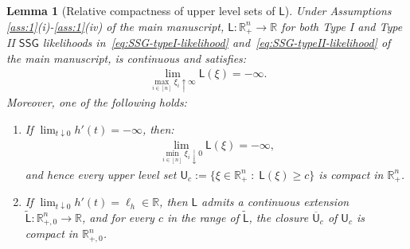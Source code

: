\documentclass[12pt]{article}
\newtheorem{lemma}{Lemma}[section]
\numberwithin{equation}{section}
\begin{document}
\begin{lemma}[Relative compactness of upper level sets of $\mathsf{L}$]
\label{lemma-conv:1}  
Under Assumptions \ref{ass:1}(i)-\ref{ass:1}(iv) of the main manuscript, $\mathsf{L}:\mathbb{R}_{+}^{n}\to \mathbb{R}$ for both Type I and Type II $\mathsf{SSG}$ likelihoods in~\eqref{eq:SSG-typeI-likelihood} and~\eqref{eq:SSG-typeII-likelihood} of the main manuscript, is continuous and satisfies:
\begin{gather}
    \label{eq:L1.1}
        \lim_{\max_{i\in [n]} \xi_i \uparrow \infty}\mathsf{L}(\xi) = -\infty.
\end{gather}
Moreover, one of the following holds:
\begin{enumerate}
    \item If $\lim_{t\downarrow 0}h'(t) = -\infty$, then:
    \begin{align}
    \label{eq:L1.2}
    \lim_{\min_{i\in [n]} \xi_i \downarrow 0} \mathsf{L}(\xi) = -\infty,
    \end{align}
    and hence every upper level set $\mathsf{U}_c := \{\xi\in \mathbb{R}^{n}_{+}\;:\;\mathsf{L}(\xi) \geq c\}$ is compact in $\mathbb{R}^{n}_{+}$.

    \item If $\lim_{t\downarrow 0}h'(t) = \ell_{h}\in \mathbb{R}$, then $\mathsf{L}$ admits a continuous extension $\tilde{\mathsf{L}}: \mathbb{R}^{n}_{+, 0} \to \mathbb{R}$, and for every $c$ in the range of $\tilde{\mathsf{L}}$, the closure $\overline{\mathsf{U}}_c$ of $\mathsf{U}_c$ is compact in $\mathbb{R}^{n}_{+, 0}$.
\end{enumerate}
\end{lemma}
\end{document}
